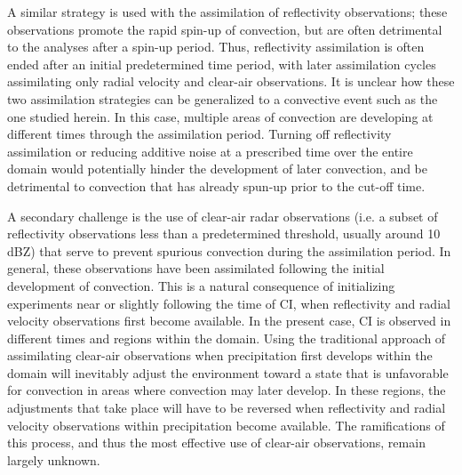 A similar strategy is used with the assimilation of reflectivity observations; these observations promote the rapid spin-up of convection, but are often detrimental to the analyses after a spin-up period. Thus, reflectivity assimilation is often ended after an initial predetermined time period, with later assimilation cycles assimilating only radial velocity and clear-air observations. It is unclear how these two assimilation strategies can be generalized to a convective event such as the one studied herein. In this case, multiple areas of convection are developing at different times through the assimilation period. Turning off reflectivity assimilation or reducing additive noise at a prescribed time over the entire domain would potentially hinder the development of later convection, and be detrimental to convection that has already spun-up prior to the cut-off time.

A secondary challenge is the use of clear-air radar observations (i.e. a subset of reflectivity observations less than a predetermined threshold, usually around 10 dBZ) that serve to prevent spurious convection during the assimilation period. In general, these observations have been assimilated following the initial development of convection. This is a natural consequence of initializing experiments near or slightly following the time of CI, when reflectivity and radial velocity observations first become available. In the present case, CI is observed in different times and regions within the domain. Using the traditional approach of assimilating clear-air observations when precipitation first develops within the domain will inevitably adjust the environment toward a state that is unfavorable for convection in areas where convection may later develop. In these regions, the adjustments that take place will have to be reversed when reflectivity and radial velocity observations within precipitation become available. The ramifications of this process, and thus the most effective use of clear-air observations, remain largely unknown.

